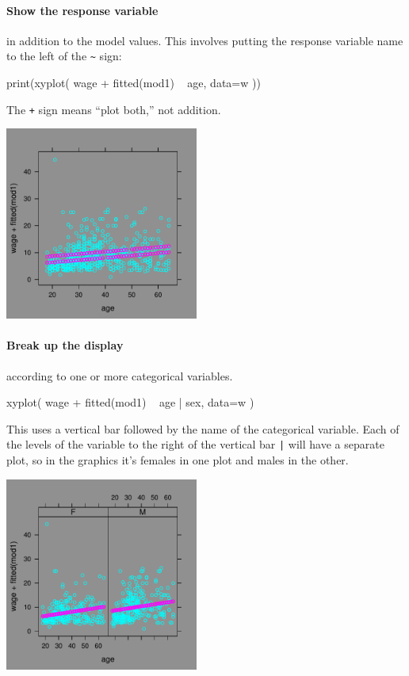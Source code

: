 \paragraph{Show the response variable} in addition to the model values.
  This involves putting the response variable name to the left of the
  \verb.~. sign:

\begin{Schunk}
\begin{Sinput}
 print(xyplot( wage + fitted(mod1) ~ age, data=w ))
\end{Sinput}
\end{Schunk}

The \texttt{+} sign means ``plot both,'' not addition.

\centerline{\includegraphics[width=2.5in]{Figures/fig-gmf3}}


\paragraph{Break up the display} according to one or more categorical
  variables.

\begin{Schunk}
\begin{Sinput}
 xyplot( wage + fitted(mod1) ~ age | sex, data=w )
\end{Sinput}
\end{Schunk}

This uses a vertical bar followed by the name of the categorical
variable.  Each of the levels of the variable to the right of the vertical bar
\verb+|+ will have a separate plot, so in the graphics it's females in
one plot and males in the other.

\centerline{\includegraphics[width=2.5in]{Figures/fig-gmf4}}


